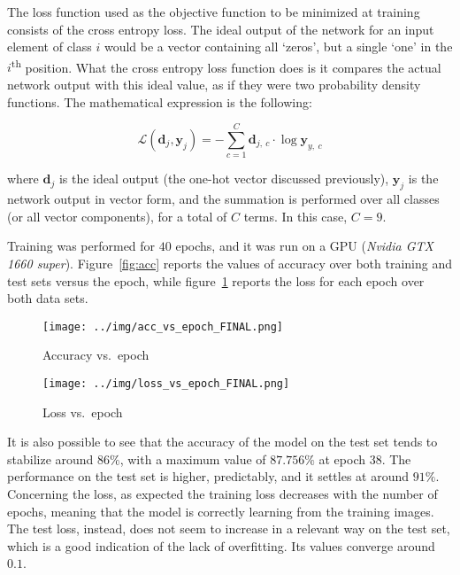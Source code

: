 \documentclass[12pt]{article}
\begin{document}
The loss function used as the objective function to be minimized at training consists of the cross entropy loss.
The ideal output of the network for an input element of class $i$ would be a vector containing all `zeros', but a single `one' in the $i$\textsuperscript{th} position.
What the cross entropy loss function does is it compares the actual network output with this ideal value, as if they were two probability density functions.
The mathematical expression is the following:

\begin{equation}
  \mathcal{L}(\textbf{d}_j, \textbf{y}_j) = - \sum_{c = 1}^{C} \textbf{d}_{j,\ c} \cdot \log{\textbf{y}_{y,\ c}}
\end{equation}

where $\textbf{d}_j$ is the ideal output (the one-hot vector discussed previously), $\textbf{y}_j$ is the network output in vector form, and the summation is performed over all classes (or all vector components), for a total of $C$ terms.
In this case, $C = 9$.

Training was performed for $40$ epochs, and it was run on a GPU (\textit{Nvidia GTX 1660 super}).
Figure\ \ref{fig:acc} reports the values of accuracy over both training and test sets versus the epoch, while figure\ \ref{fig:loss} reports the loss for each epoch over both data sets.

\begin{figure} [ht]
  \begin{minipage}{0.45\linewidth}
  \centering
    \texttt{[image: ../img/acc\_vs\_epoch\_FINAL.png]}
    \caption{Accuracy vs.\ epoch}\label{fig:acc}
  \end{minipage}
  \hspace{0.5cm}
  \begin{minipage}{0.45\linewidth}
  \centering
    \texttt{[image: ../img/loss\_vs\_epoch\_FINAL.png]}
    \caption{Loss vs.\ epoch}\label{fig:loss}
  \end{minipage}
\end{figure}

It is also possible to see that the accuracy of the model on the test set tends to stabilize around $86\%$, with a maximum value of $87.756\%$ at epoch 38.
The performance on the test set is higher, predictably, and it settles at around $91\%$.\\
Concerning the loss, as expected the training loss decreases with the number of epochs, meaning that the model is correctly learning from the training images.
The test loss, instead, does not seem to increase in a relevant way on the test set, which is a good indication of the lack of overfitting.
Its values converge around $0.1$.
\end{document}
